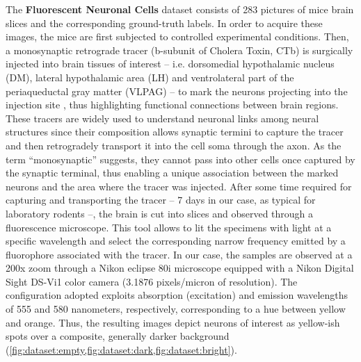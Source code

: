 The \textbf{Fluorescent Neuronal Cells} dataset \cite{clissa2021fluocells} consists of 283 
pictures 
of mice brain slices and the corresponding ground-truth labels.
In order to acquire these images, the mice are first subjected to controlled experimental conditions. Then, a monosynaptic retrograde tracer (b-subunit of Cholera Toxin, CTb) is surgically injected into brain tissues of interest -- i.e. dorsomedial hypothalamic nucleus (DM), lateral hypothalamic area (LH) and ventrolateral part of the periaqueductal gray matter (VLPAG) -- to mark the neurons projecting into the injection site \cite{hitrec2019neural}, thus highlighting functional connections between brain regions.
These tracers are widely used to understand neuronal links among neural structures since their composition allows synaptic termini to capture the tracer and then retrogradely transport it into the cell soma through the axon. As the term ``monosynaptic'' suggests, they cannot pass into other cells once captured by the synaptic terminal, thus enabling a unique association between the marked neurons and the area where the tracer was injected. 
After some time required for capturing and transporting the tracer -- 7 days in our case, as typical for laboratory rodents --, the brain is cut into slices and observed through a fluorescence microscope.
This tool allows to lit the specimens with light at a specific wavelength and select the corresponding narrow frequency emitted by a fluorophore %
associated with the tracer. 
In our case, the samples are observed at a 200x zoom through a Nikon eclipse 80i microscope equipped with a Nikon Digital Sight DS-Vi1 color camera (3.1876 pixels/micron of resolution).
The configuration adopted exploits absorption (excitation) and emission wavelengths of 555 and 580 nanometers, respectively, corresponding to a hue between yellow and orange.
Thus, the resulting images depict neurons of interest as
yellow-ish spots
over a composite, generally darker background
(\cref{fig:dataset:empty,fig:dataset:dark,fig:dataset:bright}).

